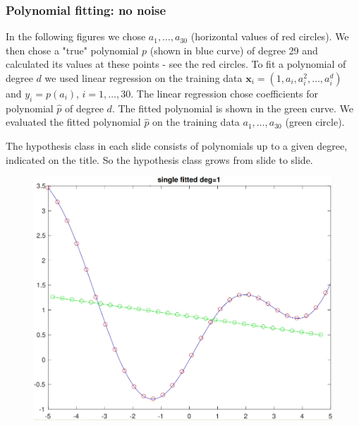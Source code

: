 \documentclass[11pt]{article}
\begin{document}
\subsubsection{Polynomial fitting: no noise}
    In the following figures we chose $a_1,\ldots,a_{30}$ (horizontal values of red circles). We then chose a "true" polynomial $p$ (shown in blue curve) of degree 29 and calculated its values at these points - see the red
    circles. To fit a polynomial of degree $d$ we used linear regression on the training data $\mathbf{x}_i=(1,a_i,a_i^2,\ldots,a_i^d)$ and $y_i=p(a_i)$,  $i=1,\ldots,30$. The linear regression chose coefficients for polynomial $\hat{p}$ of degree $d$. The fitted polynomial is shown in the green curve. We evaluated the fitted polynomial $\hat{p}$ on the training data $a_1,\ldots,a_{30}$ (green circle).

 The hypothesis class in each slide consists of polynomials up to a given degree, indicated on the title. So the hypothesis class grows from slide to slide.

\newpage
\begin{figure}[h!]
\centering\includegraphics[scale=0.3]{clean_poly_d_1.png}
\end{figure}
\end{document}
